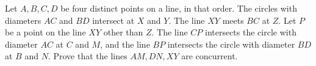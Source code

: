 Let $ A,B,C,D$ be four distinct points on a line, in that order.  The circles with diameters $ AC$ and $ BD$ intersect at $ X$ and $ Y$. The line $ XY$ meets $ BC$ at $ Z$. Let $ P$ be a point on the line $ XY$ other than $ Z$. The line $ CP$ intersects the circle with diameter $ AC$ at $ C$ and $ M$,  and the line $ BP$ intersects the circle with diameter $ BD$ at $ B$ and $ N$. Prove that the lines $ AM,DN,XY$ are concurrent.